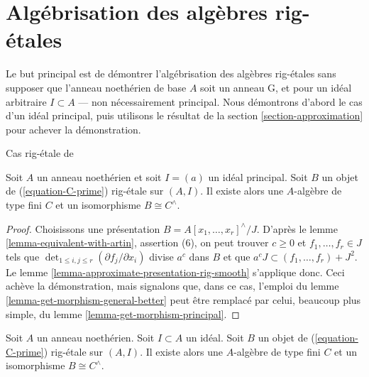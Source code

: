 \section{Algébrisation des algèbres rig-étales}
\label{section-approximation-principal}

\noindent
Le but principal est de démontrer l'algébrisation des algèbres rig-étales sans
supposer que l'anneau noethérien de base $A$ soit un anneau G, et pour un idéal
arbitraire $I \subset A$ --- non nécessairement principal. Nous démontrons
d'abord le cas d'un idéal principal, puis utilisons le résultat de la section
\ref{section-approximation} pour achever la démonstration.

\begin{lemma}
\label{lemma-approximate-principal}
\begin{reference}
Cas rig-étale de \cite[III Theorem 7]{Elkik}
\end{reference}
Soit $A$ un anneau noethérien et soit $I = (a)$ un idéal principal. Soit $B$
un objet de (\ref{equation-C-prime}) rig-étale sur $(A, I)$. Il existe alors
une $A$-algèbre de type fini $C$ et un isomorphisme $B \cong C^\wedge$.
\end{lemma}

\begin{proof}
Choisissons une présentation $B = A[x_1, \ldots, x_r]^\wedge/J$. D'après le
lemme \ref{lemma-equivalent-with-artin}, assertion (6), on peut trouver
$c \geq 0$ et $f_1, \ldots, f_r \in J$ tels que
$\det_{1 \leq i, j \leq r}(\partial f_j/\partial x_i)$ divise $a^c$ dans $B$
et que $a^c J \subset (f_1, \ldots, f_r) + J^2$. Le lemme
\ref{lemma-approximate-presentation-rig-smooth} s'applique donc. Ceci achève la
démonstration, mais signalons que, dans ce cas, l'emploi du lemme
\ref{lemma-get-morphism-general-better} peut être remplacé par celui, beaucoup
plus simple, du lemme \ref{lemma-get-morphism-principal}.
\end{proof}

\begin{lemma}
\label{lemma-approximate}
Soit $A$ un anneau noethérien. Soit $I \subset A$ un idéal. Soit $B$ un objet
de (\ref{equation-C-prime}) rig-étale sur $(A, I)$. Il existe alors une
$A$-algèbre de type fini $C$ et un isomorphisme $B \cong C^\wedge$.
\end{lemma}

